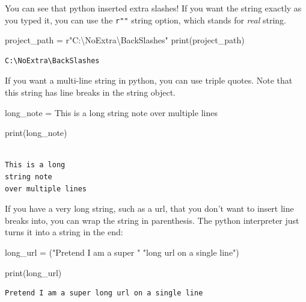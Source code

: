 \documentclass[
  letterpaper,
]{scrbook}
\newenvironment{Shaded}{\begin{snugshade}}{\end{snugshade}}
\newcommand{\BuiltInTok}[1]{\textcolor[rgb]{0.00,0.23,0.31}{#1}}
\newcommand{\NormalTok}[1]{\textcolor[rgb]{0.00,0.23,0.31}{#1}}
\newcommand{\OperatorTok}[1]{\textcolor[rgb]{0.37,0.37,0.37}{#1}}
\newcommand{\StringTok}[1]{\textcolor[rgb]{0.13,0.47,0.30}{#1}}
\newcommand{\VerbatimStringTok}[1]{\textcolor[rgb]{0.13,0.47,0.30}{#1}}
\begin{document}
You can see that python inserted extra slashes! If you want the string
exactly as you typed it, you can use the \texttt{r""} string option,
which stands for \emph{real} string.

\begin{Shaded}
\begin{Highlighting}[]
\NormalTok{project\_path }\OperatorTok{=} \VerbatimStringTok{r"C:\textbackslash{}NoExtra\textbackslash{}BackSlashes"}
\BuiltInTok{print}\NormalTok{(project\_path)}
\end{Highlighting}
\end{Shaded}

\begin{verbatim}
C:\NoExtra\BackSlashes
\end{verbatim}

If you want a multi-line string in python, you can use triple quotes.
Note that this string has line breaks in the string object.

\begin{Shaded}
\begin{Highlighting}[]
\NormalTok{long\_note }\OperatorTok{=} \StringTok{\textquotesingle{}\textquotesingle{}\textquotesingle{}}
\StringTok{This is a long}
\StringTok{string note}
\StringTok{over multiple lines}
\StringTok{\textquotesingle{}\textquotesingle{}\textquotesingle{}}

\BuiltInTok{print}\NormalTok{(long\_note)}
\end{Highlighting}
\end{Shaded}

\begin{verbatim}

This is a long
string note
over multiple lines
\end{verbatim}

If you have a very long string, such as a url, that you don't want to
insert line breaks into, you can wrap the string in parenthesis. The
python interpreter just turns it into a string in the end:

\begin{Shaded}
\begin{Highlighting}[]
\NormalTok{long\_url }\OperatorTok{=}\NormalTok{ (}\StringTok{"Pretend I am a super "}
            \StringTok{"long url on a single line"}\NormalTok{)}

\BuiltInTok{print}\NormalTok{(long\_url)}
\end{Highlighting}
\end{Shaded}

\begin{verbatim}
Pretend I am a super long url on a single line
\end{verbatim}
\end{document}
